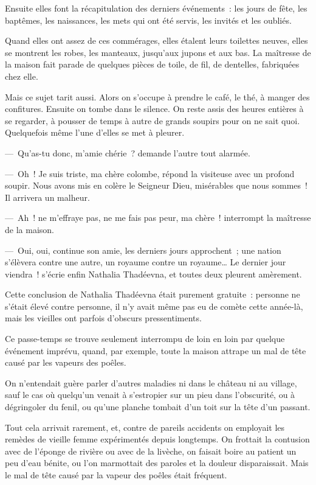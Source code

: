 \documentclass[french,twoside]{book} %
\begin{document}
Ensuite elles font la récapitulation des derniers événements : les jours de fête, les baptêmes, les naissances, les mets qui ont été servis, les invités et les oubliés.\par
Quand elles ont assez de ces commérages, elles étalent leurs toilettes neuves, elles se montrent les robes, les manteaux, jusqu’aux jupons et aux bas. La maîtresse de la maison fait parade de quelques pièces de toile, de fil, de dentelles, fabriquées chez elle.\par
Mais ce sujet tarit aussi. Alors on s’occupe à prendre le café, le thé, à manger des confitures. Ensuite on tombe dans le silence. On reste assis des heures entières à se regarder, à pousser de temps à autre de grands soupirs pour on ne sait quoi. Quelquefois même l’une d’elles se met à pleurer.\par
— Qu’as-tu donc, m’amie chérie ? demande l’autre tout alarmée.\par
— Oh ! Je suis triste, ma chère colombe, répond la visiteuse avec un profond soupir. Nous avons mis en colère le Seigneur Dieu, misérables que nous sommes ! Il arrivera un malheur.\par
— Ah ! ne m’effraye pas, ne me fais pas peur, ma chère ! interrompt la maîtresse de la maison.\par
— Oui, oui, continue son amie, les derniers jours approchent ; une nation s’élèvera contre une autre, un royaume contre un royaume… Le dernier jour viendra ! s’écrie enfin Nathalia Thadéevna, et toutes deux pleurent amèrement.\par
Cette conclusion de Nathalia Thadéevna était purement gratuite : personne ne s’était élevé contre personne, il n’y avait même pas eu de comète cette année-là, mais les vieilles ont parfois d’obscurs pressentiments.\par
Ce passe-temps se trouve seulement interrompu de loin en loin par quelque événement imprévu, quand, par exemple, toute la maison attrape un mal de tête causé par les vapeurs des poêles.\par
On n’entendait guère parler d’autres maladies ni dans le château ni au village, sauf le cas où quelqu’un venait à s’estropier sur un pieu dans l’obscurité, ou à dégringoler du fenil, ou qu’une planche tombait d’un toit sur la tête d’un passant.\par
Tout cela arrivait rarement, et, contre de pareils accidents on employait les remèdes de vieille femme expérimentés depuis longtemps. On frottait la contusion avec de l’éponge de rivière ou avec de la livèche, on faisait boire au patient un peu d’eau bénite, ou l’on marmottait des paroles et la douleur disparaissait. Mais le mal de tête causé par la vapeur des poêles était fréquent.\par
\end{document}
